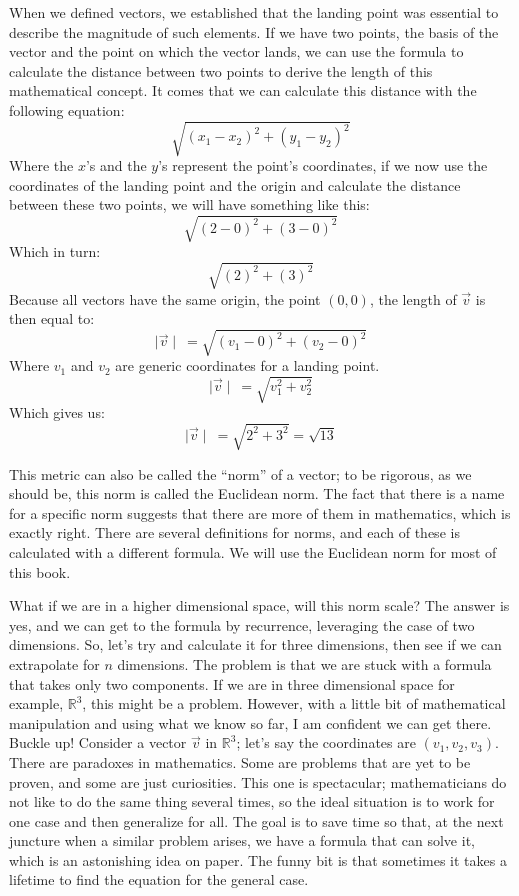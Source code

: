 \documentclass[600paper, 11pt,twoside,openany]{kdp}
\begin{document}
When we defined vectors, we established that the landing point was essential to describe the magnitude of such elements. If we have two points, the basis of the vector and the point on which the vector lands, we can use the formula to calculate the distance between two points to derive the length of this mathematical concept. It comes that we can calculate this distance with the following equation:
\[\sqrt{(x_1-x_2)^2 + (y_1-y_2)^2}\]
\indent Where the $x$'s and the $y$'s represent the point's coordinates, if we now use the coordinates of the landing point and the origin and calculate the distance between these two points, we will have something like this:
\[\sqrt{(2-0)^2 + (3-0)^2}\]
Which in turn:
\[\sqrt{(2)^2 + (3)^2}\]
\indent Because all vectors have the same origin, the point $(0,0)$, the length of $\overrightarrow{v}$ is then equal to:
\[\mid \overrightarrow{v} \mid\  =  \sqrt{(v_1-0)^{2} + (v_2-0)^{2} }\]
\indent Where $v_1$ and $v_2$ are generic coordinates for a landing point.
 \[\mid \overrightarrow{v} \mid\  =  \sqrt{v_1^{2} + v_2^{2} }\]
\indent Which gives us:
\[\mid \overrightarrow{v} \mid\  =  \sqrt{2^{2} + 3^{2} } = \sqrt{13}\]
\par 
\vspace{-3pt}
\indent This metric can also be called the “norm” of a vector; to be rigorous, as we should be, this norm is called the Euclidean norm. The fact that there is a name for a specific norm suggests that there are more of them in mathematics, which is exactly right. There are several definitions for norms, and each of these is calculated with a different formula. We will use the Euclidean norm for most of this book. 
\par 
\vspace{-3pt}
\indent What if we are in a higher dimensional space, will this norm scale? The answer is yes, and we can get to the formula by recurrence, leveraging the case of two dimensions. So, let’s try and calculate it for three dimensions, then see if we can extrapolate for $n$ dimensions. The problem is that we are stuck with a formula that takes only two components. If we are in three dimensional space for example, $\mathbb{R}^3$, this might be a problem. However, with a little bit of mathematical manipulation and using what we know so far, I am confident we can get there. Buckle up! Consider a vector $\overrightarrow{v}$ in $\mathbb{R}^3$; let’s say the coordinates are $(v_1,v_2,v_3)$. There are paradoxes in mathematics. Some are problems that are yet  to be proven, and some are just curiosities. This one is spectacular; mathematicians do not like to do the same thing several times, so the ideal situation is to work for one case and then generalize for all. The goal is to save time so that, at the next juncture when a similar problem arises, we have a formula that can solve it, which is an astonishing idea on paper. The funny bit is that sometimes it takes a lifetime to find the equation for the general case. 
\end{document}
